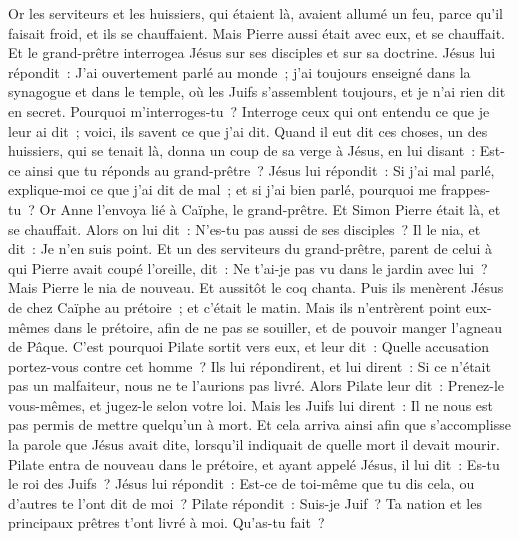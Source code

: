 \begin{multicols}{2}
Or les serviteurs et les huissiers, qui étaient là, avaient allumé un feu, parce qu'il faisait froid, et ils se chauffaient. Mais Pierre aussi était avec eux, et se chauffait.
Et le grand-prêtre interrogea Jésus sur ses disciples et sur sa doctrine.
Jésus lui répondit~: J'ai ouvertement parlé au monde~; j'ai toujours enseigné dans la synagogue et dans le temple, où les Juifs s'assemblent toujours, et je n'ai rien dit en secret.
Pourquoi m'interroges-tu~? Interroge ceux qui ont entendu ce que je leur ai dit~; voici, ils savent ce que j'ai dit.
Quand il eut dit ces choses, un des huissiers, qui se tenait là, donna un coup de sa verge à Jésus, en lui disant~: Est-ce ainsi que tu réponds au grand-prêtre~?
Jésus lui répondit~: Si j'ai mal parlé, explique-moi ce que j'ai dit de mal~; et si j'ai bien parlé, pourquoi me frappes-tu~?
Or Anne l'envoya lié à Caïphe, le grand-prêtre.
Et Simon Pierre était là, et se chauffait. Alors on lui dit~: N'es-tu pas aussi de ses disciples~? Il le nia, et dit~: Je n'en suis point.
Et un des serviteurs du grand-prêtre, parent de celui à qui Pierre avait coupé l'oreille, dit~: Ne t'ai-je pas vu dans le jardin avec lui~?
Mais Pierre le nia de nouveau. Et aussitôt le coq chanta.
Puis ils menèrent Jésus de chez Caïphe au prétoire~; et c'était le matin. Mais ils n'entrèrent point eux-mêmes dans le prétoire, afin de ne pas se souiller, et de pouvoir manger l'agneau de Pâque.
C'est pourquoi Pilate sortit vers eux, et leur dit~: Quelle accusation portez-vous contre cet homme~?
Ils lui répondirent, et lui dirent~: Si ce n'était pas un malfaiteur, nous ne te l'aurions pas livré.
Alors Pilate leur dit~: Prenez-le vous-mêmes, et jugez-le selon votre loi. Mais les Juifs lui dirent~: Il ne nous est pas permis de mettre quelqu'un à mort.
Et cela arriva ainsi afin que s'accomplisse la parole que Jésus avait dite, lorsqu'il indiquait de quelle mort il devait mourir.
Pilate entra de nouveau dans le prétoire, et ayant appelé Jésus, il lui dit~: Es-tu le roi des Juifs~?
Jésus lui répondit~: Est-ce de toi-même que tu dis cela, ou d'autres te l'ont dit de moi~?
Pilate répondit~: Suis-je Juif~? Ta nation et les principaux prêtres t'ont livré à moi. Qu'as-tu fait~?

\end{multicols}
